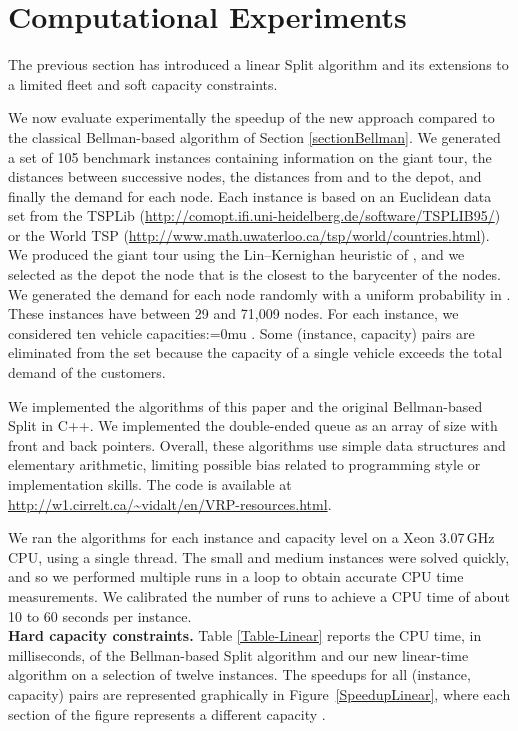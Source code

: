 \documentclass[11pt]{article}
\newcommand{\setmuskip}[2]{#1=#2\relax}
\begin{document}
\section{Computational Experiments}
\label{sectionExperiments}

The previous section has introduced a linear Split algorithm and its extensions to a limited fleet and soft capacity constraints. 



We now evaluate experimentally the speedup of the new approach compared to the classical Bellman-based algorithm of Section \ref{sectionBellman}.
We generated a set of 105 benchmark instances containing information on the giant tour, the distances between successive nodes, the distances from and to the depot, and finally the demand for each node. Each instance is based on an Euclidean data set from the TSPLib (\url{http://comopt.ifi.uni-heidelberg.de/software/TSPLIB95/}) or the World TSP (\url{http://www.math.uwaterloo.ca/tsp/world/countries.html}). We produced the giant tour using the Lin--Kernighan heuristic of \cite{Helsgaun2000}, and we selected as the depot the node that is the closest to the barycenter of the nodes. We generated the demand for each node randomly with a uniform probability in .
These instances have between 29 and 71,009 nodes.
For each instance, we considered ten vehicle capacities:\begingroup \setmuskip{\medmuskip}{0mu}
.
\endgroup
Some (instance, capacity) pairs are eliminated from the set because the capacity of a single vehicle exceeds the total demand of the customers.

We implemented the algorithms of this paper and the original Bellman-based Split in C++.
We implemented the double-ended queue  as an array of size  with front and back pointers. Overall, these  algorithms use simple data structures and elementary arithmetic, limiting possible bias related to programming style or implementation skills. The code is available at \url{http://w1.cirrelt.ca/\~vidalt/en/VRP-resources.html}. 

We ran the algorithms for each instance and capacity level on a Xeon 3.07\,GHz CPU, using a single thread. The small and medium instances were solved quickly, and so we performed multiple runs in a loop to obtain accurate CPU time measurements. We calibrated the number of runs to achieve a CPU time of about 10 to 60 seconds per instance. \\

\textbf{Hard capacity constraints.}
Table \ref{Table-Linear} reports the CPU time, in milliseconds, of the Bellman-based Split algorithm and our new linear-time algorithm on a selection of twelve instances. The speedups for all  (instance, capacity) pairs are represented graphically in Figure~\ref{SpeedupLinear}, where each section of the figure represents a different capacity .
\end{document}
